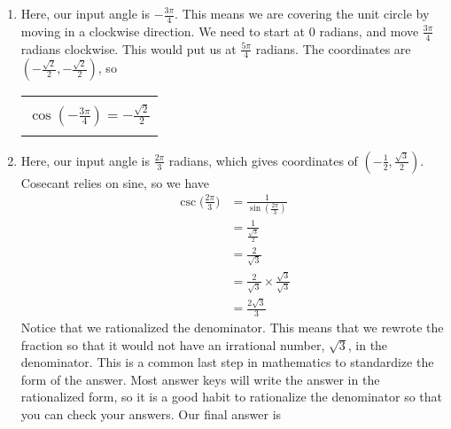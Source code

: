 {\begin{enumerate}
		\begin{equation*}
			\begin{split}
				\sec{(3\pi)} & = \frac{1}{\cos{(3\pi)}} \\[6pt]
					     & = \frac{1}{-1} \\[6pt]
					     & = -1
			\end{split}
		\end{equation*}
		So, we have
			\begin{center}
		\begin{tabular}{| c |} \hline
			\\[-8pt]
			$\displaystyle \sec{(3\pi)}= -1$ \\[-8pt]
			\\\hline
		\end{tabular}
	\end{center}
	\item Here, our input angle is $-\frac{3\pi}{4}$. This means we are covering the unit circle by moving in a clockwise direction. We need to start at $0$ radians, and move $\frac{3\pi}{4}$ radians clockwise. This would put us at $\frac{5\pi}{4}$ radians. The coordinates are $(-\frac{\sqrt{2}}{2}, -\frac{\sqrt{2}}{2})$, so 
			\begin{center}
		\begin{tabular}{| c |} \hline
			\\[-8pt]
			$\displaystyle \cos{(-\frac{3\pi}{4})} = -\frac{\sqrt{2}}{2}$ \\[-8pt]
			\\\hline
		\end{tabular}
	\end{center}
\drawexampleline
	\item Here, our input angle is $\frac{2\pi}{3}$ radians, which gives coordinates of $(-\frac{1}{2}, \frac{\sqrt{3}}{2})$. Cosecant relies on sine, so we have
		\begin{equation*}
			\begin{split}
				\csc{\bigg(\frac{2\pi}{3}\bigg)} & = \frac{1}{\sin{(\frac{2\pi}{3})}} \\[6pt]
						       & = \frac{1}{\frac{\sqrt{3}}{2}} \\[6pt]
						       & = \frac{2}{\sqrt{3}} \\[6pt]
						       & = \frac{2}{\sqrt{3}} \times \frac{\sqrt{3}}{\sqrt{3}} \\[6pt]
						       & = \frac{2\sqrt{3}}{3}
			\end{split}
		\end{equation*}
		Notice that we rationalized the denominator. This means that we rewrote the fraction so that it would not have an irrational number, $\sqrt{3}$, in the denominator. This is a common last step in mathematics to standardize the form of the answer. Most answer keys will write the answer in the rationalized form, so it is a good habit to rationalize the denominator so that you can check your answers. Our final answer is

\end{enumerate}}

